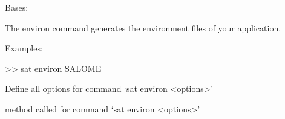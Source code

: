 \documentclass[a4paper,10pt,english]{sphinxmanual}
\begin{document}
\begin{fulllineitems}
\label{\detokenize{apidoc_commands/commands:commands.environ.Command}}
Bases: 

The environ command generates the environment files of your application.

\begin{DUlineblock}{0em}
\item[] Examples:
\item[] \textgreater{}\textgreater{} sat environ SALOME
\end{DUlineblock}

\begin{fulllineitems}
\label{\detokenize{apidoc_commands/commands:commands.environ.Command.getParser}}
Define all options for command ‘sat environ \textless{}options\textgreater{}’

\end{fulllineitems}


\begin{fulllineitems}
\label{\detokenize{apidoc_commands/commands:commands.environ.Command.name}}
\end{fulllineitems}


\begin{fulllineitems}
\label{\detokenize{apidoc_commands/commands:commands.environ.Command.run}}
method called for command ‘sat environ \textless{}options\textgreater{}’

\end{fulllineitems}


\end{fulllineitems}

\end{document}
